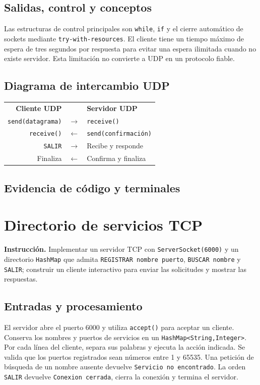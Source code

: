\documentclass[12pt,oneside]{book}
\begin{document}
\section{Salidas, control y conceptos}
Las estructuras de control principales son \texttt{while}, \texttt{if} y el cierre automático de sockets mediante \texttt{try-with-resources}. El cliente tiene un tiempo máximo de espera de tres segundos por respuesta para evitar una espera ilimitada cuando no existe servidor. Esta limitación no convierte a UDP en un protocolo fiable.

\section{Diagrama de intercambio UDP}
\begin{center}
\begin{tabular}{r c l}
\textbf{Cliente UDP} & & \textbf{Servidor UDP}\\[.4em]
\texttt{send(datagrama)} & $\longrightarrow$ & \texttt{receive()}\\[.4em]
\texttt{receive()} & $\longleftarrow$ & \texttt{send(confirmación)}\\[.4em]
\texttt{SALIR} & $\longrightarrow$ & Recibe y responde\\[.4em]
Finaliza & $\longleftarrow$ & Confirma y finaliza
\end{tabular}
\end{center}

\section{Evidencia de código y terminales}

\chapter{Directorio de servicios TCP}
\textbf{Instrucción.} Implementar un servidor TCP con \texttt{ServerSocket(6000)} y un directorio \texttt{HashMap} que admita \texttt{REGISTRAR nombre puerto}, \texttt{BUSCAR nombre} y \texttt{SALIR}; construir un cliente interactivo para enviar las solicitudes y mostrar las respuestas.

\section{Entradas y procesamiento}
El servidor abre el puerto 6000 y utiliza \texttt{accept()} para aceptar un cliente. Conserva los nombres y puertos de servicios en un \texttt{HashMap<String,Integer>}. Por cada línea del cliente, separa sus palabras y ejecuta la acción indicada. Se valida que los puertos registrados sean números entre 1 y 65535. Una petición de búsqueda de un nombre ausente devuelve \texttt{Servicio no encontrado}. La orden \texttt{SALIR} devuelve \texttt{Conexion cerrada}, cierra la conexión y termina el servidor.
\end{document}
